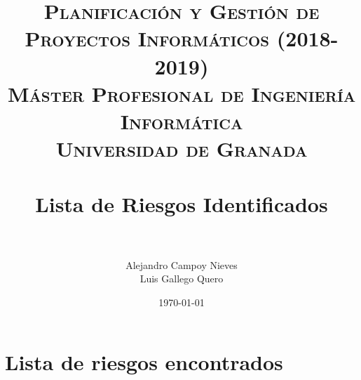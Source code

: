 

\title{	
	\normalfont \normalsize 
	\textsc{\textbf{Planificación y Gestión de Proyectos Informáticos (2018-2019)} \\ Máster Profesional de Ingeniería Informática \\ Universidad de Granada} \\ [25pt] %
	\horrule{0.5pt} \\[0.4cm] %
	\huge Lista de Riesgos Identificados \\ %
	\horrule{2pt} \\[0.5cm] %
}

\author{Alejandro Campoy Nieves \\ Luis Gallego Quero} %
\date{\normalsize\today} %

\usepackage[spanish, es-tabla]{babel}
\usepackage{hyperref} %
\hypersetup{
	colorlinks=true,
	linkcolor=blue,
	filecolor=magenta,      
	urlcolor=cyan,
}
\usepackage{graphicx}
\usepackage{amssymb, amsmath, amsbsy}
\usepackage{mathptmx}	
\usepackage{float}
\usepackage{booktabs}					%
\usepackage{eurosym}
\usepackage{xcolor}
\usepackage{colortbl}




	\maketitle %
	
	\newpage %
	
	\tableofcontents %
	
	
	
	\newpage	
 
 \section{Lista de riesgos encontrados}
 
